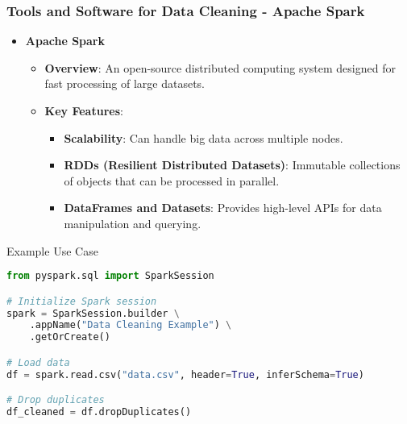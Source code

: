 \documentclass[aspectratio=169]{beamer}
\begin{document}
\begin{frame}[fragile]
    \frametitle{Tools and Software for Data Cleaning - Apache Spark}
    \begin{itemize}
        \item \textbf{Apache Spark}
        \begin{itemize}
            \item \textbf{Overview}: An open-source distributed computing system designed for fast processing of large datasets.
            \item \textbf{Key Features}:
            \begin{itemize}
                \item \textbf{Scalability}: Can handle big data across multiple nodes.
                \item \textbf{RDDs (Resilient Distributed Datasets)}: Immutable collections of objects that can be processed in parallel.
                \item \textbf{DataFrames and Datasets}: Provides high-level APIs for data manipulation and querying.
            \end{itemize}
        \end{itemize}
    \end{itemize}
    \begin{block}{Example Use Case}
        \begin{lstlisting}[language=python]
from pyspark.sql import SparkSession

# Initialize Spark session
spark = SparkSession.builder \
    .appName("Data Cleaning Example") \
    .getOrCreate()

# Load data
df = spark.read.csv("data.csv", header=True, inferSchema=True)

# Drop duplicates
df_cleaned = df.dropDuplicates()
        \end{lstlisting}
    \end{block}
\end{frame}
\end{document}
